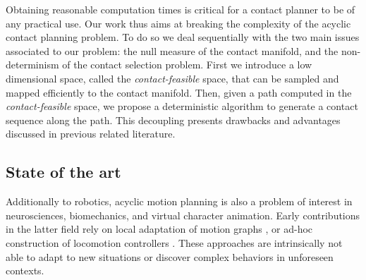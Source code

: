 Obtaining reasonable computation times is critical for a contact planner to be of any practical use. Our work thus aims at breaking the complexity of the acyclic contact planning problem.  To do so we deal sequentially with the two main issues associated to our problem: the null measure of the contact manifold, and the non-determinism of the contact selection problem. First we introduce a low dimensional space, called the \textit{contact-feasible} space, that can be sampled and mapped efficiently to the contact manifold. Then, given a path computed in the \textit{contact-feasible} space, we propose a deterministic algorithm to generate a contact sequence along the path.
This decoupling  presents drawbacks and advantages discussed in previous related literature.


\subsection{State of the art}

\newcommand{\Pa}{$\mathcal{P}_1$ }
\newcommand{\Pb}{$\mathcal{P}_2$ }

Additionally to robotics, acyclic motion planning is also a problem of interest in neurosciences, biomechanics, and virtual character animation.
Early contributions in the latter field rely on local adaptation of motion graphs \citep{citeulike:220163}, or ad-hoc construction of locomotion controllers \citep{Pettre:2003:LPD:846276.846313}. These approaches are intrinsically not able to adapt to new situations or discover complex behaviors in unforeseen contexts.

